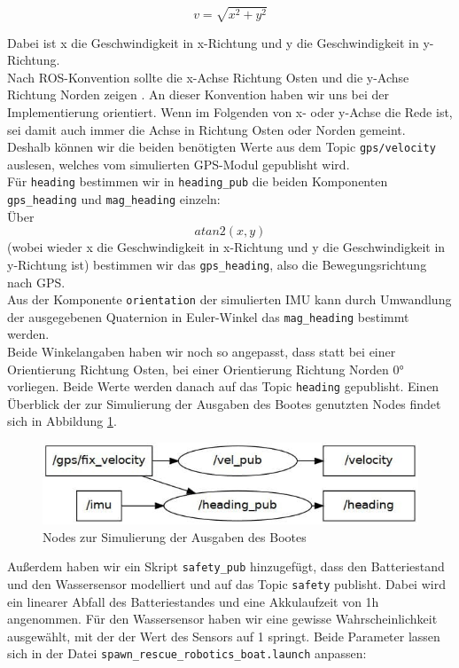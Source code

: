 \documentclass[11pt]{article}
\begin{document}
\begin{equation}
v = \sqrt{x^2+y^2}
\end{equation}

Dabei ist x die Geschwindigkeit in x-Richtung und y die Geschwindigkeit in y-Richtung.\\
Nach ROS-Konvention sollte die x-Achse Richtung Osten und die y-Achse Richtung Norden zeigen \cite{REP105}. An dieser Konvention haben wir uns bei der Implementierung orientiert. Wenn im Folgenden von x- oder y-Achse die Rede ist, sei damit auch immer die Achse in Richtung Osten oder Norden gemeint.\\
Deshalb können wir die beiden benötigten Werte aus dem Topic \texttt{gps/velocity} auslesen, welches vom simulierten GPS-Modul gepublisht wird.\\
Für \texttt{heading} bestimmen wir in \texttt{heading\_pub} die beiden Komponenten \texttt{gps\_heading} und \texttt{mag\_heading} einzeln:\\
Über 
\begin{equation}
	atan2(x,y) 	
\end{equation}
(wobei wieder x die Geschwindigkeit in x-Richtung und y die Geschwindigkeit in y-Richtung ist) bestimmen wir das \texttt{gps\_heading}, also die Bewegungsrichtung nach GPS. \\
Aus der Komponente \texttt{orientation} der simulierten IMU kann durch Umwandlung der ausgegebenen Quaternion in Euler-Winkel das \texttt{mag\_heading} bestimmt werden.\\
Beide Winkelangaben haben wir noch so angepasst, dass statt bei einer Orientierung Richtung Osten, bei einer Orientierung Richtung Norden 0° vorliegen. Beide Werte werden danach auf das Topic \texttt{heading} gepublisht. Einen Überblick der zur Simulierung der Ausgaben des Bootes genutzten Nodes findet sich in Abbildung \ref{output-sim-nodes}.\\

\begin{figure}
	\centering
	\includegraphics[width=0.7\linewidth]{simulation-nodes}
	\caption{Nodes zur Simulierung der Ausgaben des Bootes}
	\label{output-sim-nodes}
\end{figure}
Außerdem haben wir ein Skript \texttt{safety\_pub} hinzugefügt, dass den Batteriestand und den Wassersensor modelliert und auf das Topic \texttt{safety} publisht. Dabei wird ein linearer Abfall des Batteriestandes und eine Akkulaufzeit von 1h angenommen. Für den Wassersensor haben wir eine gewisse Wahrscheinlichkeit ausgewählt, mit der der Wert des Sensors auf 1 springt. Beide Parameter lassen sich in der Datei \texttt{spawn\_rescue\_robotics\_boat.launch} anpassen:
\end{document}
